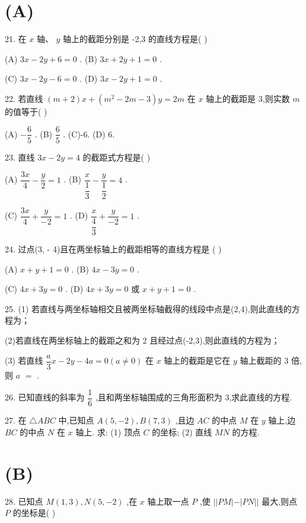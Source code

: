 \section*{(A)}

21. 在 $x$ 轴、 $y$ 轴上的截距分别是 -2,3 的直线方程是(   )

(A) ${3x} - {2y} + 6 = 0$ . (B) ${3x} + {2y} + 1 = 0$ .

(C) ${3x} - {2y} - 6 = 0$ . (D) ${3x} - {2y} + 1 = 0$ .

22. 若直线 $\left( {m + 2}\right) x + \left( {{m}^{2} - {2m} - 3}\right) y = {2m}$ 在 $x$ 轴上的截距是 3,则实数 $m$ 的值等于(   )

(A) $- \dfrac{6}{5}$ . (B) $\dfrac{6}{5}$ . (C)-6. (D) 6.

23. 直线 ${3x} - {2y} = 4$ 的截距式方程是(   )

(A) $\dfrac{3x}{4} - \dfrac{y}{2} = 1$ . (B) $\dfrac{x}{\dfrac{1}{3}} - \dfrac{y}{\dfrac{1}{2}} = 4$ .

(C) $\dfrac{3x}{4} + \dfrac{y}{-2} = 1$ . (D) $\dfrac{x}{\dfrac{4}{3}} + \dfrac{y}{-2} = 1$ .

24. 过点(3, - 4)且在两坐标轴上的截距相等的直线方程是 (   )

(A) $x + y + 1 = 0$ . (B) ${4x} - {3y} = 0$ .

(C) ${4x} + {3y} = 0$ . (D) ${4x} + {3y} = 0$ 或 $x + y + 1 = 0$ .

25. (1) 若直线与两坐标轴相交且被两坐标轴截得的线段中点是(2,4),则此直线的方程为\blkda{}；

(2)若直线在两坐标轴上的截距之和为 2 且经过点(-2,3),则此直线的方程为\blkda{}；

(3) 若直线 $\dfrac{a}{3}x - {2y} - {4a} = 0\left( {a \neq  0}\right)$ 在 $x$ 轴上的截距是它在 $y$ 轴上截距的 3 倍,则 $a$  $=$ \blkda{}.

26. 已知直线的斜率为 $\dfrac{1}{6}$ ,且和两坐标轴围成的三角形面积为 3,求此直线的方程.

27. 在 $\bigtriangleup {ABC}$ 中,已知点 $A\left( {5, - 2}\right) ,B\left( {7,3}\right)$ ,且边 ${AC}$ 的中点 $M$ 在 $y$ 轴上,边 ${BC}$ 的中点 $N$ 在 $x$ 轴上. 求: (1) 顶点 $C$ 的坐标; (2) 直线 ${MN}$ 的方程.

\section*{(B)}

28. 已知点 $M\left( {1,3}\right) ,N\left( {5, - 2}\right)$ ,在 $x$ 轴上取一点 $P$ ,使 $\left| \right| {PM}\left| -\right| {PN}\left| \right|$ 最大,则点 $P$ 的坐标是(   )

